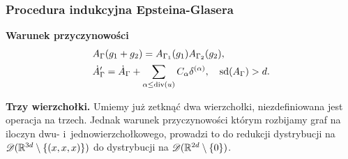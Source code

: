 \documentclass[10pt,t]{beamer}
\begin{document}
\begin{frame}
  \frametitle{Procedura indukcyjna Epsteina-Glasera}


  \textbf{Warunek przyczynowości}
  \begin{subequations}
    \begin{align}
      \label{eq:Epstein-Glaser-27-A}
      &A_{ \Gamma }( g _{ 1 } + g_{ 2 } ) =
        A_{ \Gamma_{ 1 } }( g _{ 1 } ) A_{ \Gamma_{ 2 } }( g_{ 2 } ), \\
      \label{eq:Epstein-Glaser-27-B}
      &\dot{ A }_{ \Gamma }' =
        \dot{ A }_{ \Gamma }
        + \sum\limits_{ \alpha \leq \textrm{div}( u ) } C_{ \alpha } \delta^{ ( \alpha ) }, \quad
        \textrm{sd}( A_{ \Gamma } ) > d.
    \end{align}
  \end{subequations}


  \textbf{Trzy wierzchołki.}
  Umiemy już zetknąć dwa wierzchołki, niezdefiniowana jest operacja na
  trzech. Jednak warunek przyczynowości którym rozbijamy graf na
  iloczyn dwu- i~jednowierzchołkowego, prowadzi to do redukcji
  dystrybucji na $\mathcal{D}( \mathbb{R}^{ 3 d } \setminus \{ ( x, x, x ) \} )$ do
  dystrybucji na $\mathcal{D}( \mathbb{R}^{ 2 d } \setminus \{ 0 \} )$.

\end{frame}
\end{document}
